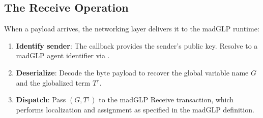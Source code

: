 \subsection{The Receive Operation}
\label{sec:receive-op}
When a payload arrives, the networking layer delivers it to the madGLP runtime:
\begin{enumerate}
\item \textbf{Identify sender}: The  callback provides the sender's public key. Resolve to a madGLP agent identifier via .
\item \textbf{Deserialize}: Decode the byte payload to recover the global variable name $G$ and the globalized term $T^\uparrow$.
\item \textbf{Dispatch}: Pass $(G, T^\uparrow)$ to the madGLP Receive transaction, which performs localization and assignment as specified in the madGLP definition.
\end{enumerate}
